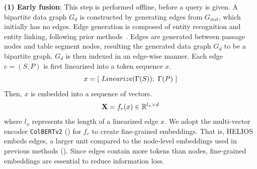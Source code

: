 \textbf{(1) Early fusion}: 
This step is performed offline, before a query is given.
A bipartite data graph $G_d$ is constructed by generating edges from $G_{init}$, which initially has no edges. %
Edge generation is composed of entity recognition and entity linking, following prior methods~\citep{CORE, COS}.
Edges are generated between passage nodes and table segment nodes, resulting the generated data graph $G_d$ to be a bipartite graph.
$G_d$ is then indexed in an edge-wise manner.
Each edge $e = (S, P)$ is first linearized into a token sequence $x$.
\vspace{-1mm}
\begin{equation}    
    x = [\ Linearize(\Gamma(S));\ \Gamma(P)\ ]
    \vspace{-1mm}
\end{equation}
Then, $x$ is embedded into a sequence of vectors.
\vspace{-2mm}
\begin{equation}    
    \textbf{X} = f_{e}(x) \in \mathbb{R}^{l_x \times d}
    \vspace{-2mm}
\end{equation}
where $l_x$ represents the length of a linearized edge $x$.
{\editcolor We adopt the multi-vector encoder \texttt{ColBERTv2} (\citealp{ColBERTv2}) for $f_e$ to create fine-grained embeddings.
That is, HELIOS embeds edges, a larger unit compared to the node-level embeddings used in previous methods (\citealp{CORE, COS}). 
Since edges contain more tokens than nodes, fine-grained embeddings are essential to reduce information loss.}



